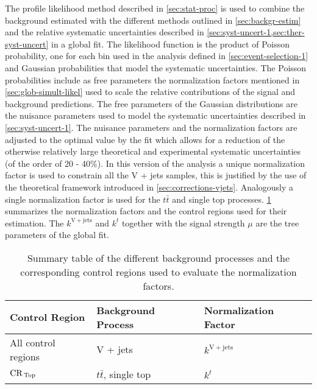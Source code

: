 The profile likelihood method described in \cref{sec:stat-proc} is used to
combine the background estimated with the different methods outlined in
\cref{sec:backgr-estim} and the relative systematic uncertainties described in
\cref{sec:syst-uncert-1,sec:ther-syst-uncert} in a global fit. The likelihood
function is the product of Poisson probability, one for each bin used in the
analysis defined in \cref{sec:event-selection-1} and Gaussian probabilities that
model the systematic uncertainties. The Poisson probabilities include as free
parameters the normalization factors mentioned in \cref{sec:glob-simult-likel}
used to scale the relative contributions of the signal and background
predictions. The free parameters of the Gaussian distributions are the nuisance
parameters used to model the systematic uncertainties described in
\cref{sec:syst-uncert-1}. The nuisance parameters and the normalization factors
are adjusted to the optimal value by the fit which allows for a reduction of the
otherwise relatively large theoretical and experimental systematic uncertainties
(of the order of 20 - 40\%).  In this version of the analysis a unique
normalization factor is used to constrain all the V + jets samples, this is
justified by the use of the theoretical framework introduced in
\cref{sec:corrections-vjets}. Analogously a single normalization factor is used
for the $t \bar{t}$ and single top processes. \cref{tab:norm_factors_2016}
summarizes the normalization factors and the control regions used for their
estimation. The $k^\mathrm{V + jets}$ and $k^t$ together with the signal
strength $\mu$ are the tree parameters of the global fit.
\begin{table}[!th]
  \centering
  \begin{tabular}{lll}
    \toprule
    Control Region & Background Process & Normalization Factor \\
    \midrule \midrule
    All control regions & V + jets & $k^\mathrm{V + jets}$ \\
    $\mathrm{CR}_\mathrm{\, Top}$ & $t \bar{t}$, single top & $k^t$ \\
    \bottomrule
  \end{tabular}
  \caption{Summary table of the different background processes and the
    corresponding control regions used to evaluate the normalization factors.}
  \label{tab:norm_factors_2016}
\end{table}
